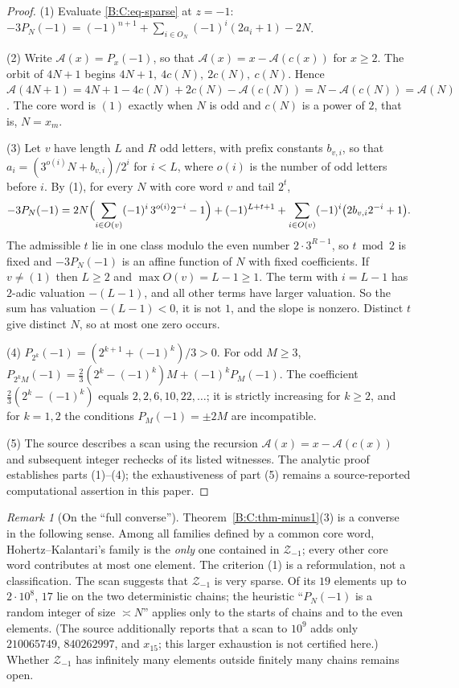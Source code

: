 \documentclass[11pt,a4paper]{article}
\theoremstyle{definition}
\theoremstyle{remark}
\newtheorem{remark}[theorem]{Remark}
\numberwithin{equation}{section}
\begin{document}
\begin{proof}
(1) Evaluate \eqref{B:C:eq-sparse} at $z=-1$:
$-3P_N(-1)=(-1)^{n+1}+\sum_{i\in O_N}(-1)^i(2a_i+1)-2N$.

(2) Write $\mathcal A(x)=P_x(-1)$, so that $\mathcal A(x)=x-\mathcal A(c(x))$ for
$x\ge2$.  The orbit of $4N+1$ begins $4N+1,\ 4c(N),\ 2c(N),\ c(N)$.  Hence
$\mathcal A(4N+1)=4N+1-4c(N)+2c(N)-\mathcal A(c(N))
=N-\mathcal A(c(N))=\mathcal A(N)$.  The core word is $(1)$ exactly when $N$ is
odd and $c(N)$ is a power of $2$, that is, $N=x_m$.

(3) Let $v$ have length $L$ and $R$ odd letters, with prefix constants $b_{v,i}$,
so that $a_i=(3^{o(i)}N+b_{v,i})/2^i$ for $i<L$, where $o(i)$ is the number of
odd letters before $i$.  By (1), for every $N$ with core word $v$ and tail $2^t$,
\[
-3P_N(-1)=2N\Bigl(\sum_{i\in O(v)}(-1)^i\,3^{o(i)}2^{-i}-1\Bigr)
+(-1)^{L+t+1}+\sum_{i\in O(v)}(-1)^i\bigl(2b_{v,i}2^{-i}+1\bigr).
\]
The admissible $t$ lie in one class modulo the even number $2\cdot3^{R-1}$, so
$t\bmod2$ is fixed and $-3P_N(-1)$ is an affine function of $N$ with fixed
coefficients.  If $v\ne(1)$ then $L\ge2$ and $\max O(v)=L-1\ge1$.  The term with
$i=L-1$ has $2$-adic valuation $-(L-1)$, and all other terms have larger
valuation.  So the sum has valuation $-(L-1)<0$, it is not $1$, and the slope is
nonzero.  Distinct $t$ give distinct $N$, so at most one zero occurs.

(4) $P_{2^k}(-1)=(2^{k+1}+(-1)^k)/3>0$.  For odd $M\ge3$,
$P_{2^kM}(-1)=\tfrac23(2^k-(-1)^k)M+(-1)^kP_M(-1)$.  The coefficient
$\tfrac23(2^k-(-1)^k)$ equals $2,2,6,10,22,\dots$; it is strictly increasing for
$k\ge2$, and for $k=1,2$ the conditions $P_M(-1)=\pm2M$ are incompatible.

(5) The source describes a scan using the recursion
$\mathcal A(x)=x-\mathcal A(c(x))$ and subsequent integer rechecks of its listed
witnesses. The analytic proof establishes parts (1)--(4); the exhaustiveness
of part (5) remains a source-reported computational assertion in this paper.
\end{proof}

\begin{remark}[On the ``full converse'']\label{B:C:rem-HK}
Theorem~\ref{B:C:thm-minus1}(3) is a converse in the following sense.  Among all
families defined by a common core word, Hohertz--Kalantari's family is the
\emph{only} one contained in $\mathcal Z_{-1}$; every other core word
contributes at most one element.  The criterion (1) is a reformulation, not a
classification.  The scan suggests that $\mathcal Z_{-1}$ is very sparse.  Of its $19$ elements up to
$2\cdot10^8$, $17$ lie on the two deterministic chains; the heuristic ``$P_N(-1)$ is a random
integer of size $\asymp N$'' applies only to the starts of chains and to the even elements.
(The source additionally reports that a scan to $10^9$ adds only
$210065749$, $840262997$, and $x_{15}$; this larger exhaustion is not certified here.)  Whether $\mathcal Z_{-1}$ has infinitely many
elements outside finitely many chains remains open.
\end{remark}
\end{document}
